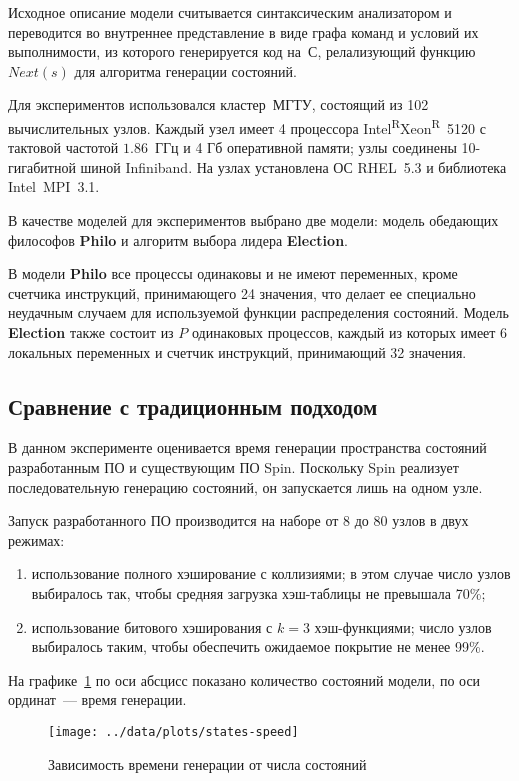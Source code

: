 \documentclass[12pt,a4paper,fleqn]{article}
\newcommand\regsign{\textsuperscript{\textcircled{\scriptsize{R}}}}
\newcommand{\Code}[1]{\textbf{\mbox{#1}}}
\begin{document}
Исходное описание модели считывается синтаксическим анализатором и переводится во
внутреннее представление в виде графа команд и условий их выполнимости, из которого
генерируется код на~С, релализующий функцию $Next(s)$ для алгоритма генерации состояний.

Для экспериментов использовался кластер~МГТУ, состоящий из 102 вычислительных
узлов. Каждый узел имеет 4 процессора Intel\regsign Xeon\regsign~5120 с тактовой частотой
$1.86$~ГГц и 4 Гб оперативной памяти; узлы соединены 10-гигабитной шиной Infiniband. На
узлах установлена ОС RHEL~5.3 и библиотека Intel~MPI~3.1.

В качестве моделей для экспериментов выбрано две модели: модель обедающих философов
\Code{Philo} и алгоритм выбора лидера \Code{Election}.

В модели \Code{Philo} все процессы одинаковы и не имеют переменных, кроме счетчика
инструкций, принимающего 24 значения, что делает ее специально неудачным случаем для
используемой функции распределения состояний. Модель \Code{Election} также состоит из $P$
одинаковых процессов, каждый из которых имеет 6 локальных переменных и счетчик инструкций,
принимающий 32 значения.

\subsection{Сравнение с традиционным подходом}

В данном эксперименте оценивается время генерации пространства состояний разработанным ПО
и существующим ПО Spin. Поскольку Spin реализует последовательную генерацию состояний, он
запускается лишь на одном узле.

Запуск разработанного ПО производится на наборе от 8 до 80 узлов в двух режимах:
\begin{enumerate}
\item использование полного хэширование с коллизиями; в этом случае число узлов выбиралось
  так, чтобы средняя загрузка хэш-таблицы не превышала 70\%;
\item использование битового хэширования с $k = 3$ хэш-функциями; число узлов выбиралось
  таким, чтобы обеспечить ожидаемое покрытие не менее 99\%.
\end{enumerate}

На графике~\ref{fig:states-speed} по оси абсцисс показано количество состояний модели, по
оси ординат~--- время генерации.

\begin{figure}[ht]
  \centering
  \texttt{[image: ../data/plots/states-speed]}
  \caption{Зависимость времени генерации от числа состояний}
  \label{fig:states-speed}
\end{figure}
\end{document}
